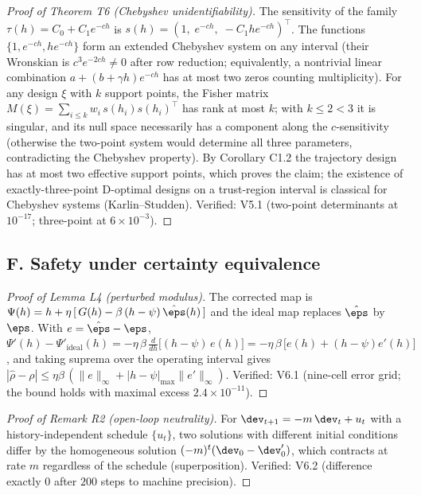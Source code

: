 \begin{proof}[Proof of Theorem T6 (Chebyshev unidentifiability)]
The sensitivity of the family $\tau(h) = C_0 + C_1 e^{-ch}$ is
$s(h) = (1,\; e^{-ch},\; -C_1 h e^{-ch})^\top$. The functions
$\{1, e^{-ch}, h e^{-ch}\}$ form an extended Chebyshev system on any
interval (their Wronskian is $c^3 e^{-2ch} \ne 0$ after row reduction;
equivalently, a nontrivial linear combination
$a + (b + \gamma h)e^{-ch}$ has at most two zeros counting multiplicity).
For any design $\xi$ with $k$ support points, the Fisher matrix
$M(\xi) = \sum_{i\le k} w_i\, s(h_i) s(h_i)^\top$ has rank at most $k$;
with $k \le 2 < 3$ it is singular, and its null space necessarily has a
component along the $c$-sensitivity (otherwise the two-point system would
determine all three parameters, contradicting the Chebyshev property). By
Corollary C1.2 the trajectory design has at most two effective support
points, which proves the claim; the existence of exactly-three-point
D-optimal designs on a trust-region interval is classical for Chebyshev
systems (Karlin--Studden). Verified: V5.1 (two-point determinants at
$10^{-17}$; three-point at $6\times 10^{-3}$).
\end{proof}

\subsection*{F. Safety under certainty equivalence}

\begin{proof}[Proof of Lemma L4 (perturbed modulus)]
The corrected map is $\Psi(h) = h + \eta\,[\,G(h) - \beta\,(h-\psi)\,
\hat\eps(h)\,]$ and the ideal map replaces $\hat\eps$ by $\eps$. With
$e = \hat\eps - \eps$,
$\Psi'(h) - \Psi'_{\mathrm{ideal}}(h) = -\eta\,\beta\,\tfrac{d}{dh}
\big[(h-\psi)\,e(h)\big] = -\eta\,\beta\,\big[e(h) + (h-\psi)e'(h)\big]$,
and taking suprema over the operating interval gives
$|\hat\rho - \rho| \le \eta\beta\,(\|e\|_\infty + |h-\psi|_{\max}
\|e'\|_\infty)$. Verified: V6.1 (nine-cell error grid; the bound holds
with maximal excess $2.4\times10^{-11}$).
\end{proof}

\begin{proof}[Proof of Remark R2 (open-loop neutrality)]
For $\dev_{t+1} = -m\,\dev_t + u_t$ with a history-independent schedule
$\{u_t\}$, two solutions with different initial conditions differ by the
homogeneous solution $(-m)^t(\dev_0 - \dev_0')$, which contracts at rate
$m$ regardless of the schedule (superposition). Verified: V6.2 (difference
exactly $0$ after $200$ steps to machine precision).
\end{proof}

